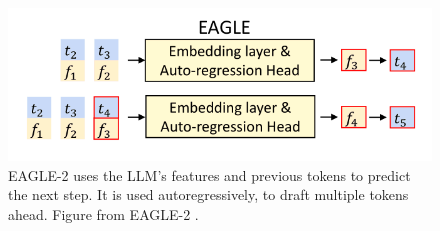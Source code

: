 \begin{figure}[h]
	\centering
	\includegraphics[width=0.7\linewidth]{fig/EAGLE_model.png}
	\caption{EAGLE-2 uses the LLM's \textcolor{orange-ish}{features} and previous \textcolor{blue-ish}{tokens} to predict the next step. It is used autoregressively, to draft multiple tokens ahead. Figure from EAGLE-2 \cite{li2024eagle}.}
	\label{fig:EAGLE_model}
  \end{figure}
